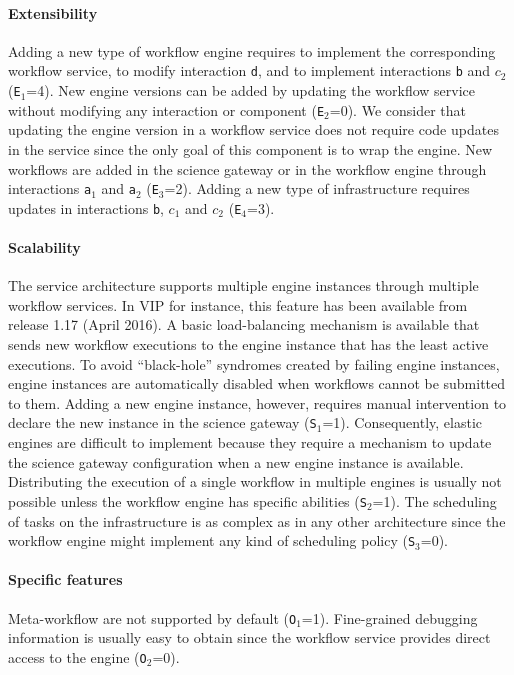 \documentclass[preprint,3p,twocolumn]{elsarticle}
\begin{document}
\paragraph{Extensibility} Adding a new type of workflow engine
requires to implement the corresponding workflow service, to modify
interaction \texttt{d}, and to implement interactions \texttt{b} and
\texttt{$c_2$} (\texttt{E$_1$}=4). New engine versions can be added by
updating the workflow service without modifying any interaction or
component (\texttt{E$_2$}=0). We consider that updating the engine
version in a workflow service does not require code updates in the
service since the only goal of this component is to wrap the engine.
New workflows are added in the science gateway or in the workflow
engine through interactions \texttt{a$_1$} and \texttt{a$_2$}
(\texttt{E$_3$}=2). Adding a new type of infrastructure requires
updates in interactions \texttt{b}, \texttt{$c_1$} and \texttt{$c_2$}
(\texttt{E$_4$}=3).

\paragraph{Scalability} The service architecture supports multiple
engine instances through multiple workflow services. In VIP for
instance, this feature has been available from release 1.17 (April
2016). A basic load-balancing mechanism is available that sends new
workflow executions to the engine instance that has the least active
executions. To avoid ``black-hole'' syndromes created by failing
engine instances, engine instances are automatically disabled when
workflows cannot be submitted to them. Adding a new engine instance,
however, requires manual intervention to declare the new instance in
the science gateway (\texttt{S$_1$}=1). Consequently, elastic engines
are difficult to implement because they require a mechanism to update
the science gateway configuration when a new engine instance is
available. Distributing the execution of a single
workflow in multiple engines is usually not possible unless the
workflow engine has specific abilities (\texttt{S$_2$}=1). The
scheduling of tasks on the infrastructure is as complex as in any
other architecture since the workflow engine might implement any kind
of scheduling policy (\texttt{S$_3$}=0).

\paragraph{Specific features} Meta-workflow are not supported by default
(\texttt{O$_1$}=1). Fine-grained debugging information is usually easy
to obtain since the workflow service provides direct access to the
engine (\texttt{O$_2$}=0).
\end{document}
